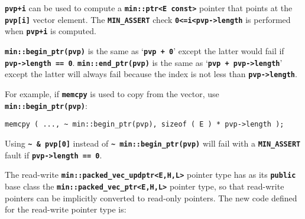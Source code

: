\documentclass[12pt]{article}
\newcommand{\TT}[1]{{\tt \bfseries #1}}
\newcommand{\EOL}{\penalty \exhyphenpenalty}
\newenvironment{indpar}[1][0.3in]%
	{\begin{list}{}%
		     {\setlength{\itemsep}{0in}%
		      \setlength{\topsep}{0in}%
		      \setlength{\parsep}{1ex}%
		      \setlength{\labelwidth}{#1}%
		      \setlength{\leftmargin}{#1}%
		      \addtolength{\leftmargin}{\labelsep}}%
	 \item}%
	{\end{list}}
\begin{document}
\TT{pvp+i} can be used to compute a \TT{min::ptr<E const>} pointer that
points at the \TT{pvp[i]} vector element.
The \TT{MIN\_\EOL ASSERT} check \TT{0<=i<pvp->length}
is performed when \TT{pvp+i} is computed.

\TT{min::begin\_ptr(pvp)} is the same as `\TT{pvp + 0}'
except the latter would fail if \TT{pvp->\EOL length == 0}.
\TT{min::end\_ptr(pvp)} is the same as `\TT{pvp + pvp->length}'
except the latter will always fail because the index is not less than
\TT{pvp->length}.

For example, if \TT{memcpy} is used to copy
from the vector, use \TT{min::begin\_\EOL ptr(pvp)}:
\begin{indpar}\begin{verbatim}
memcpy ( ..., ~ min::begin_ptr(pvp), sizeof ( E ) * pvp->length );
\end{verbatim}\end{indpar}
Using \TT{\textasciitilde~\& pvp[0]}
instead of \TT{\textasciitilde~min::begin\_ptr(pvp)}
will fail with a \TT{MIN\_\EOL ASSERT} fault if \TT{pvp->\EOL length == 0}.

The read-write \TT{min::\EOL packed\_\EOL vec\_\EOL updptr<E,H,L>}
pointer type has as its \TT{public} base class the
\TT{min::\EOL packed\_\EOL vec\_\EOL ptr<E,H,L>} pointer type,
so that read-write pointers can be implicitly converted to
read-only pointers.  The new code defined for the read-write
pointer type is:
\end{document}
